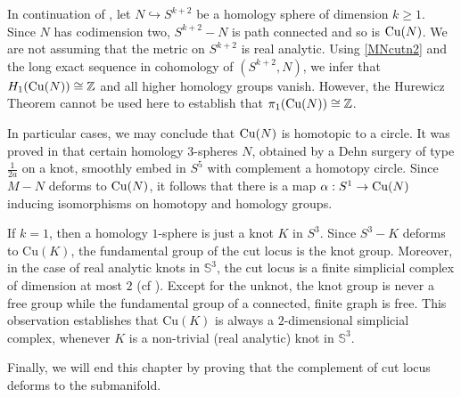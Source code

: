 \begin{eg}\label{codim2}
    In continuation of , let $N\hookrightarrow S^{k+2}$ be a homology sphere of dimension $k\geq 1$. Since $N$ has codimension two, $S^{k+2}-N$ is path connected and so is $\mathrm{Cu}(N)$. We are not assuming that the metric on $S^{k+2}$ is real analytic. Using \eqref{MNcutn2} and the long exact sequence in cohomology of $(S^{k+2},N)$, we infer that $H_1(\mathrm{Cu}(N))\cong\mathbb{Z}$ and all higher homology groups vanish. However, the Hurewicz Theorem cannot be used here to establish that $\pi_1(\mathrm{Cu}(N))\cong\mathbb{Z}$. 
    
    \vspace{0.1cm}
    \hf In particular cases, we may conclude that $\mathrm{Cu}(N)$ is homotopic to a circle. It was proved in \cite{Plo82} that certain homology $3$-spheres $N$, obtained by a Dehn surgery of type $\frac{1}{2a}$ on a knot, smoothly embed in $S^5$ with complement a homotopy circle. Since $M-N$ deforms to $\mathrm{Cu}(N)$, it follows that there is a map $\alpha:S^1\to \mathrm{Cu}(N)$ inducing isomorphisms on homotopy and homology groups.

    \vspace{0.1cm}
    \hf If $k=1$, then a homology $1$-sphere is just a knot $K$ in $S^3$. Since $S^3-K$ deforms to $\mathrm{Cu}(K)$, the fundamental group of the cut locus is the knot group. Moreover, in the case of real analytic knots in $\mathbb{S}^3$, the cut locus is a finite simplicial complex of dimension at most $2$ (cf ). Except for the unknot, the knot group is never a free group while the fundamental group of a connected, finite graph is free. This observation establishes that $\mathrm{Cu}(K)$ is always a $2$-dimensional simplicial complex, whenever $K$ is a non-trivial (real analytic) knot in $\mathbb{S}^3$.
\end{eg}

\hf Finally, we will end this chapter by proving that the complement of cut locus deforms to the submanifold.

